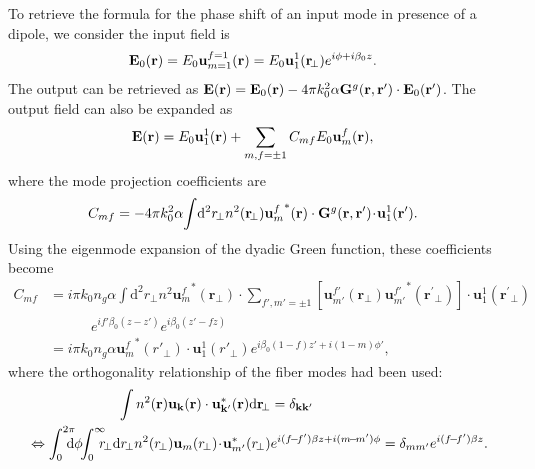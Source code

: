 \documentclass[preprint,aps,pra,onecolumn]{revtex4-1} %
\begin{document}
To retrieve the formula for the phase shift of an input mode in presence of a dipole, we consider the input field is
\begin{align}
\mathbf{E}_0(\mathbf{r}) &= E_0 \mathbf{u}_{m=1}^{f=1} (\mathbf{r}) = E_0 \mathbf{u}_1^1 (\mathbf{r}\!_\perp)e^{i\phi+i\beta_0 z}. 
\end{align}
The output can be retrieved as
$\mathbf{E}(\mathbf{r})  = \mathbf{E}_0(\mathbf{r}) -4\pi k_0^2 \alpha \mathbf{G}^g(\mathbf{r},\mathbf{r}')\cdot\mathbf{E}_0(\mathbf{r}')$.
The output field can also be expanded as
\begin{align}
\mathbf{E}(\mathbf{r}) &= E_0\mathbf{u}_{1}^{1} (\mathbf{r}) + \sum_{m,f=\pm 1} C_{mf} E_0 \mathbf{u}_m^f(\mathbf{r}),  
\end{align}
where the mode projection coefficients are
\begin{align}
C_{mf} &= -4\pi k_0^2 \alpha \!\int\! \mathrm{d}^2r\!_\perp n^2(\mathbf{r}\!_\perp){\mathbf{u}^f_m}^*(\mathbf{r})\cdot \mathbf{G}^g(\mathbf{r},\mathbf{r}') \!\cdot\! \mathbf{u}_1^1(\mathbf{r}^\prime).
\end{align}
Using the eigenmode expansion of the dyadic Green function, these coefficients become
\begin{align}
C_{mf} &= i\pi k_0 n_g\alpha \!\int\! \mathrm{d}^2r\!_\perp n^2 {\mathbf{u}^f_m}^*(\mathbf{r}\!_\perp)\cdot\!\!\!\!\!\! \sum_{f',m'=\pm 1}\!\!\!\! \left[\mathbf{u}_{m'}^{f'}(\mathbf{r}\!_\perp){\mathbf{u}^{f'}_{m'}}^*(\mathbf{r}^\prime\!_\perp) \right]\!\cdot\! \mathbf{u}_1^1(\mathbf{r}^\prime\!_\perp)\nonumber\\
&\quad\quad\quad e^{if'\beta_0(z-z')} e^{i\beta_0(z'-fz)}\\
&= i\pi k_0 n_g\alpha  {\mathbf{u}^f_m}^*(r'_{\!\perp})\cdot \mathbf{u}_1^1(r'_{\!\perp})e^{i\beta_0 (1-f)z'+i(1-m)\phi'},\label{eq:Cmf}
\end{align}
where the orthogonality relationship of the fiber modes had been used:
\begin{align}
\int n^2(\br)  \mathbf{u}_{\mathbf{k}}(\br) \cdot \mathbf{u}^*_{\mathbf{k}'}(\br)\mathrm{d} \br\!_\perp &=\delta_{\mathbf{k}\mathbf{k}'}\\
\Leftrightarrow \int_0^{2\pi}\!\!\!\!\! \mathrm{d}\phi\!\! \int_0^\infty\!\!\!\! r\!_\perp \mathrm{d}r\!_\perp  n^2(r\!_\perp) \mathbf{u}_{m}(r\!_\perp )\!\cdot\!\mathbf{u}_{m'}^*(r\!_\perp )& e^{i(f\!-\!f')\beta z+i(m\! -\! m')\phi}  =\delta_{mm'}e^{i(f\!-\!f')\beta z} \label{eq:orthutrans}.
\end{align}
\end{document}
